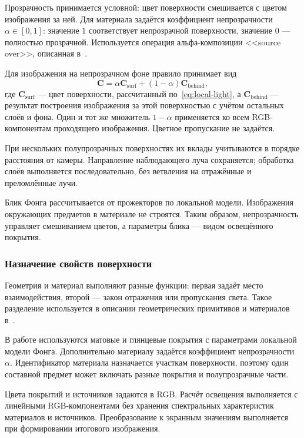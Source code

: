 Прозрачность принимается условной: цвет поверхности смешивается с цветом изображения за ней. Для материала задаётся коэффициент непрозрачности $\alpha\in[0,1]$: значение $1$ соответствует непрозрачной поверхности, значение $0$ --- полностью прозрачной. Используется операция альфа-композиции <<source over>>, описанная в~\cite[разд.~5.1]{alpha-compositing}.

Для изображения на непрозрачном фоне правило принимает вид
\begin{equation}
  \mathbf C=\alpha\mathbf C_{\mathrm{surf}}+
             (1-\alpha)\mathbf C_{\mathrm{behind}},
  \label{eq:alpha-compositing}
\end{equation}
где $\mathbf C_{\mathrm{surf}}$ --- цвет поверхности, рассчитанный по~\eqref{eq:local-light}, а $\mathbf C_{\mathrm{behind}}$ --- результат построения изображения за этой поверхностью с учётом остальных слоёв и фона. Один и тот же множитель $1-\alpha$ применяется ко всем RGB-компонентам проходящего изображения. Цветное пропускание не задаётся.

При нескольких полупрозрачных поверхностях их вклады учитываются в порядке расстояния от камеры. Направление наблюдающего луча сохраняется; обработка слоёв выполняется последовательно, без ветвления на отражённые и преломлённые лучи.

Блик Фонга рассчитывается от прожекторов по локальной модели. Изображения окружающих предметов в материале не строятся. Таким образом, непрозрачность управляет смешиванием цветов, а параметры блика --- видом освещённого покрытия.

\subsubsection{Назначение свойств поверхности}

Геометрия и материал выполняют разные функции: первая задаёт место взаимодействия, второй --- закон отражения или пропускания света. Такое разделение используется в описании геометрических примитивов и материалов в~\cite[разд.~7.1, 10.5]{pbrt4}.

В работе используются матовые и глянцевые покрытия с параметрами локальной модели Фонга. Дополнительно материалу задаётся коэффициент непрозрачности $\alpha$. Идентификатор материала назначается участкам поверхности, поэтому один составной предмет может включать разные покрытия и полупрозрачные части.

Цвета покрытий и источников задаются в RGB. Расчёт освещения выполняется с линейными RGB-компонентами без хранения спектральных характеристик материалов и источников. Преобразование к экранным значениям выполняется при формировании итогового изображения.

